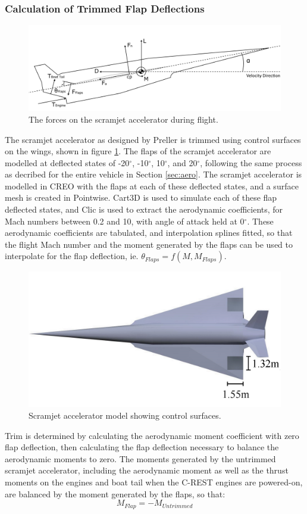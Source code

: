 		
		
		\subsubsection{Calculation of Trimmed Flap Deflections}\label{sec:trim}
		\begin{figure}[ht]
			\centering
			\includegraphics[width=0.7\linewidth]{figures/3_vehicle_design/SPARTANForces}
			\caption{The forces on the scramjet accelerator during flight.}
			\label{fig:SPARTANForces}
		\end{figure}
		The scramjet accelerator as designed by Preller\cite{Preller2017b} is trimmed using control surfaces on the wings, shown in figure \ref{fig:SPARTANForces}. 
		The flaps of the scramjet accelerator are modelled at deflected states of -20$^\circ$, -10$^\circ$, 10$^\circ$, and 20$^\circ$, following the same process as decribed for the entire vehicle in Section \ref{sec:aero}. The scramjet accelerator is modelled in CREO with the flaps at each of these deflected states, and a surface mesh is created in Pointwise. 
		Cart3D is used to simulate each of these flap deflected states, and Clic is used to extract the aerodynamic coefficients, for Mach numbers between 0.2 and 10, with angle of attack held at 0$^\circ$. These aerodynamic coefficients are tabulated, and interpolation splines fitted, so that the flight Mach number and the moment generated by the flaps can be used to interpolate for the flap deflection, ie. $\theta_{Flaps} = f(M,M_{Flaps})$.
		\begin{figure}[ht]
			\centering
			\includegraphics[width=0.6\linewidth]{figures/3_vehicle_design/SPARTAN_FLAPS}
			\caption{Scramjet accelerator model showing control surfaces.}
			\label{fig:SPARTAN_FLAPS}
		\end{figure}
		Trim is determined by calculating the aerodynamic moment coefficient with zero flap deflection, then calculating the flap deflection necessary to balance the aerodynamic moments to zero. The moments generated by the untrimmed scramjet accelerator, including the aerodynamic moment as well as the thrust moments on the engines and boat tail when the C-REST engines are powered-on, are balanced by the moment generated by the flaps, so that:
		\begin{equation}
		M_{Flap} = -M_{Untrimmed}
		\end{equation}
		  
